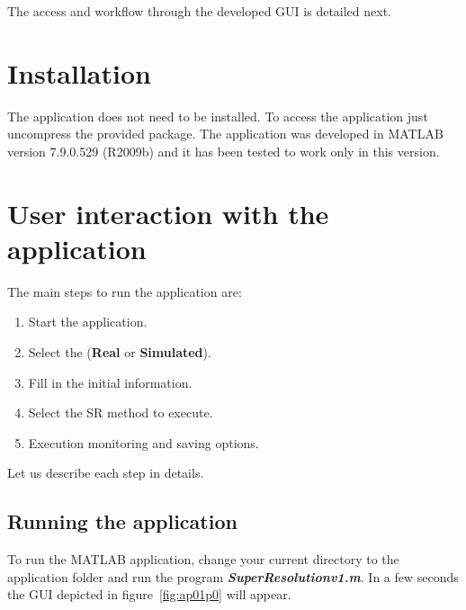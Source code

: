 \documentclass[11pt,a4paper]{article}
\begin{document}
The access and workflow through the developed GUI is detailed next.

\section{Installation}

The application does not need to be installed. To access the application just uncompress the provided package. The application was developed in MATLAB\textregistered{} version 7.9.0.529 (R2009b) and it has been tested to work only in this version.

\section{User interaction with the application}

The main steps to run the application are:
\begin{enumerate}
	\item Start the application.
	\item Select the (\textbf{Real} or \textbf{Simulated}).
	\item Fill in the initial information.
	\item Select the SR method to execute.
	\item Execution monitoring and saving options. 
\end{enumerate}
Let us describe each step in details.

\subsection{Running the application}

To run the MATLAB\textregistered{} application, change your current directory to the application folder and run the program \textit{\textbf{SuperResolutionv1.m}}. In a few seconds the GUI depicted in figure~\ref{fig:ap01p0} will appear.
\end{document}
